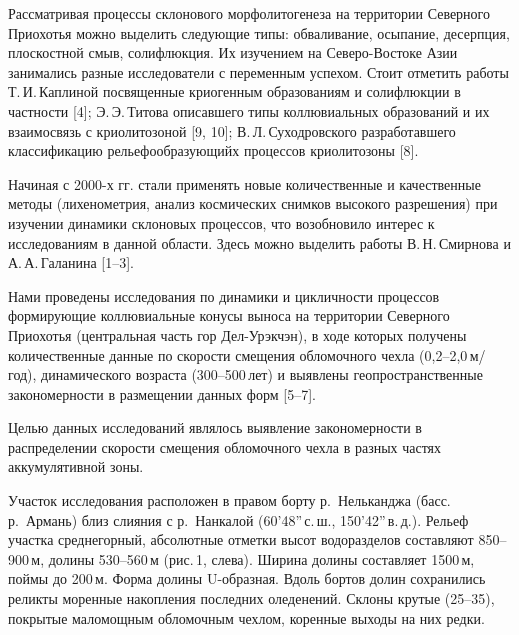  

\makeProcTitle
{}

Рассматривая процессы склонового морфолитогенеза на территории Северного Приохотья
можно выделить следующие типы: обваливание, осыпание, десерпция, плоскостной смыв, солифлюкция.
Их изучением на Северо-Востоке Азии занимались разные исследователи с переменным успехом.
Стоит отметить работы Т.\,И.\,Каплиной посвященные криогенным образованиям
и солифлюкции в частности [4]; Э.\,Э.\,Титова описавшего типы коллювиальных образований
и их взаимосвязь с криолитозоной [9, 10]; В.\,Л.\,Суходровского разработавшего классификацию рельефообразующийх процессов криолитозоны [8].

Начиная с 2000-х гг. стали применять новые количественные и качественные методы (лихенометрия, анализ космических снимков высокого разрешения) при изучении динамики склоновых процессов,
что возобновило интерес к исследованиям в данной области. Здесь можно выделить работы В.\,Н.\,Смирнова и А.\,А.\,Галанина [1--3].

Нами проведены исследования по динамики и цикличности процессов формирующие коллювиальные конусы выноса на территории Северного Приохотья (центральная часть гор Дел-Урэкчэн), в ходе которых получены количественные данные по скорости смещения обломочного чехла (0,2--2,0\,м/год), динамического возраста (300--500\,лет) и выявлены геопространственные закономерности в размещении данных форм [5--7].

Целью данных исследований являлось выявление закономерности в распределении скорости смещения обломочного чехла в разных частях аккумулятивной зоны.

Участок исследования расположен в правом борту р.~Нельканджа (басс. р.~Армань) близ слияния с р.~Нанкалой (60’48”\,с.\,ш., 150’42”\,в.\,д.). Рельеф участка среднегорный, абсолютные отметки высот водоразделов составляют 850--900\,м, долины 530--560\,м (рис.\,1, слева). Ширина долины составляет 1500\,м, поймы до 200\,м. Форма долины U-образная. Вдоль бортов долин сохранились реликты моренные накопления последних оледенений. Склоны крутые (25--35\dg), покрытые маломощным обломочным чехлом, коренные выходы на них редки.

